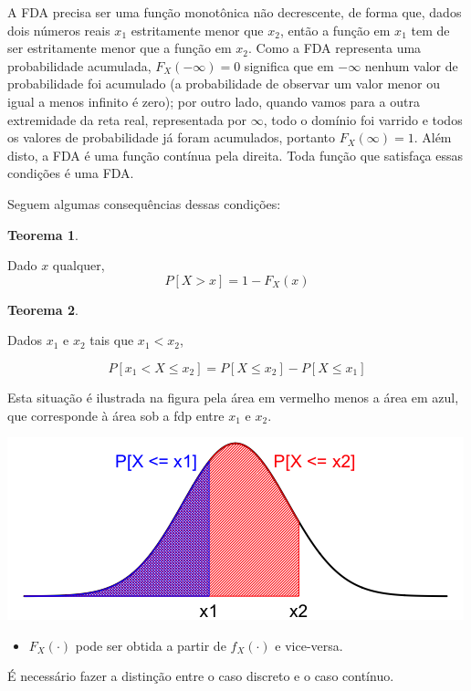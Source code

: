 \documentclass[
]{book}
\providecommand{\tightlist}{%
  \setlength{\itemsep}{0pt}\setlength{\parskip}{0pt}}
\newtheorem{theorem}{Teorema}[chapter]
\theoremstyle{definition}
\theoremstyle{definition}
\theoremstyle{definition}
\theoremstyle{remark}
\begin{document}
A FDA precisa ser uma função monotônica não decrescente, de forma que, dados dois números reais \(x_1\) estritamente menor que \(x_2\), então a função em \(x_1\) tem de ser estritamente menor que a função em \(x_2\). Como a FDA representa uma probabilidade acumulada, \(F_X(-\infty) = 0\) significa que em \(-\infty\) nenhum valor de probabilidade foi acumulado (a probabilidade de observar um valor menor ou igual a menos infinito é zero); por outro lado, quando vamos para a outra extremidade da reta real, representada por \(\infty\), todo o domínio foi varrido e todos os valores de probabilidade já foram acumulados, portanto \(F_X(\infty) = 1\). Além disto, a FDA é uma função contínua pela direita. Toda função que satisfaça essas condições é uma FDA.

Seguem algumas consequências dessas condições:

\begin{theorem}
\protect\hypertarget{thm:unnamed-chunk-9}{}{\label{thm:unnamed-chunk-9} }
\end{theorem}

Dado \({x}\) qualquer,
\[{P[X > x] = 1- F_X(x)}\]

\begin{theorem}
\protect\hypertarget{thm:unnamed-chunk-10}{}{\label{thm:unnamed-chunk-10} }
\end{theorem}

Dados \({x_1}\) e \({x_2}\) tais que \({x_1 < x_2}\),

\[{P[x_1< X \leq x_2] = P[X \leq x_2] - P[X \leq x_1]}\]

Esta situação é ilustrada na figura pela área em vermelho menos a área em azul, que corresponde à área sob a fdp entre \(x_1\) e \(x_2\).

\includegraphics[width=0.6\linewidth]{img/FDA}

\begin{itemize}
\tightlist
\item
  \({F_X(\cdot)}\) pode ser obtida a partir de \({f_X(\cdot)}\) e vice-versa.
\end{itemize}

É necessário fazer a distinção entre o caso discreto e o caso contínuo.
\end{document}
